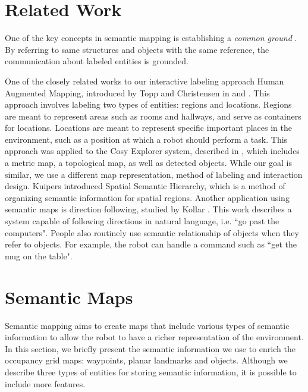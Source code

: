 \section{Related Work}
\label{sec:map_relevant_work}

One of the key concepts in semantic mapping is establishing a \textit{common ground} \cite{clark1991grounding}. By referring to same structures and objects with the same reference, the communication about labeled entities is grounded.

One of the closely related works to our interactive labeling approach Human Augmented Mapping, introduced by Topp and Christensen in \cite{topp2006topological} and \cite{topp2010detecting}. This approach involves labeling two types of entities: regions and locations. Regions are meant to represent areas such as rooms and hallways, and serve as containers for locations. Locations are meant to represent specific important places in the environment, such as a position at which a robot should perform a task. This approach was applied to the Cosy Explorer system, described in \cite{zender2007integrated}, which includes a metric map, a topological map, as well as detected objects. While our goal is similar, we use a different map representation, method of labeling and interaction design. Kuipers \cite{kuipers2000spatial} introduced Spatial Semantic Hierarchy, which is a method of organizing semantic information for spatial regions. Another application using semantic maps is direction following, studied by Kollar \cite{kollar2010toward}. This work describes a system capable of following directions in natural language, i.e. ``go past the computers". People also routinely use semantic relationship of objects when they refer to objects. For example, the robot can handle a command such as ``get the mug on the table".

\section{Semantic Maps}
\label{sec:map_semantic_maps}

Semantic mapping aims to create maps that include various types of semantic information to allow the robot to have a richer representation of the environment. In this section, we briefly present the semantic information we use to enrich the occupancy grid maps: waypoints, planar landmarks and objects. Although we describe three types of entities for storing semantic information, it is possible to include more features.

